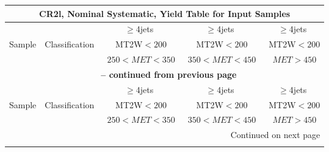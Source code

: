 \documentclass{article}
\begin{document}
\begin{longtable}{|l|c|c|c|c|} 
 
\multicolumn{5}{c}{ CR2l, Nominal Systematic, Yield Table for Input Samples }\\* \hline 
 &  & $\ge$4jets  & $\ge$4jets  & $\ge$4jets \\* 
Sample & Classification  & ~MT2W$<200$  & ~MT2W$<200$  & ~MT2W$<200$ \\* 
 &  & ~$250<MET<350$  & ~$350<MET<450$  & ~$MET>450$ \\* 
\hline \hline 
\endfirsthead 
 
\multicolumn{5}{c}{{\bfseries \tablename\ \thetable{} -- continued from previous page}}\\* \hline 
 &  & $\ge$4jets  & $\ge$4jets  & $\ge$4jets \\* 
Sample & Classification  & ~MT2W$<200$  & ~MT2W$<200$  & ~MT2W$<200$ \\* 
 &  & ~$250<MET<350$  & ~$350<MET<450$  & ~$MET>450$ \\* 
\hline \hline 
\endhead 
 
\multicolumn{5}{|r|}{{Continued on next page}}\\* \hline 
\endfoot 
 
 
\endlastfoot 
 

\end{longtable}
\end{document}
